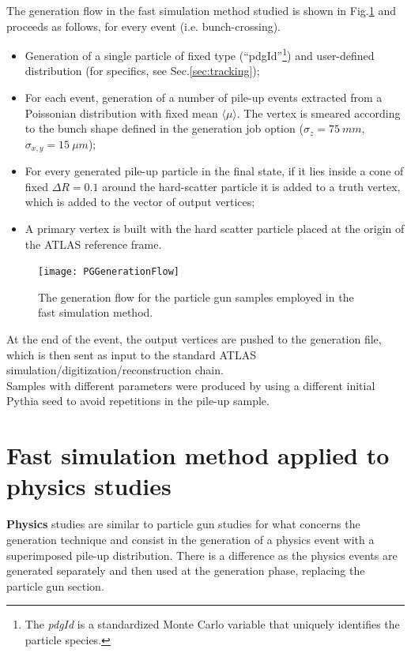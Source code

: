 \documentclass[a4paper,twoside,12pt]{book}
\begin{document}
The generation flow in the fast simulation method studied is shown in Fig.\ref{fig:PGGenerationFlow} and proceeds as follows,
for every event (i.e. bunch-crossing).\\
\begin{itemize}
\item Generation of a single particle of fixed type (``pdgId''\footnote{The \textit{pdgId} 
is a standardized Monte Carlo variable that uniquely identifies the particle species.}) and 
user-defined distribution (for specifics, see Sec.\ref{sec:tracking});
\item For each event, generation of a number of pile-up events extracted from a Poissonian
distribution with fixed mean $\langle\mu\rangle$. The vertex is smeared according to the bunch shape
defined in the generation job option ($\sigma_{z} = 75\ mm$, $\sigma_{x,y} = 15\ \mu m$);
\item For every generated pile-up particle in the final state, if it lies inside a cone of fixed
$\Delta R = 0.1$ around the hard-scatter particle it is added to a truth vertex, which is added to the vector of output vertices;
\item A primary vertex is built with the hard scatter particle placed at the origin of the
ATLAS reference frame.
\end{itemize}

\begin{figure} [h]
	\texttt{[image: PGGenerationFlow]}
	\caption{The generation flow for the particle gun samples employed in the fast 
	simulation method. }
	\label{fig:PGGenerationFlow}
\end{figure}

At the end of the event, the output vertices are pushed to the generation file, which is then
sent as input to the standard ATLAS simulation/digitization/reconstruction chain.\\

Samples with different parameters were produced by using a different initial Pythia seed to 
avoid repetitions in the pile-up sample. \\

\section{Fast simulation method applied to physics studies}\label{sec:simulation:physicsSimulation}

\textbf{Physics} studies are similar to particle gun studies for what concerns the generation technique and 
consist in the generation of a physics event with a superimposed pile-up distribution. There is a difference as
the physics events are generated separately and then used at the generation phase, replacing the particle gun
section.\\
\end{document}
